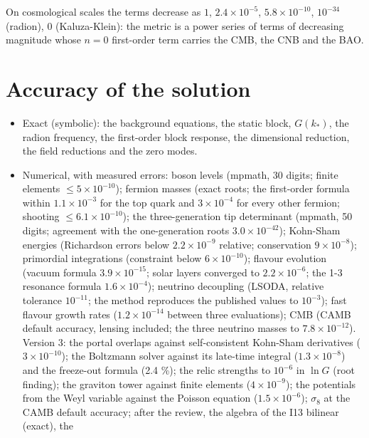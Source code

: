 \documentclass[
  10pt,
]{article}
\providecommand{\tightlist}{%
  \setlength{\itemsep}{0pt}\setlength{\parskip}{0pt}}
\begin{document}
On cosmological scales the terms decrease as \(1\),
\(2.4\times10^{-5}\), \(5.8\times10^{-10}\), \(10^{-34}\) (radion),
\(0\) (Kaluza-Klein): the metric is a power series of terms of
decreasing magnitude whose \(n = 0\) first-order term carries the CMB,
the CNB and the BAO.

\hypertarget{accuracy-of-the-solution}{%
\section{Accuracy of the solution}\label{accuracy-of-the-solution}}

\begin{itemize}
\tightlist
\item
  Exact (symbolic): the background equations, the static block,
  \(G(k_*)\), the radion frequency, the first-order block response, the
  dimensional reduction, the field reductions and the zero modes.
\item
  Numerical, with measured errors: boson levels (mpmath, 30 digits;
  finite elements \(\le 5\times10^{-10}\)); fermion masses (exact roots;
  the first-order formula within \(1.1\times10^{-3}\) for the top quark
  and \(3\times10^{-4}\) for every other fermion; shooting
  \(\le 6.1\times10^{-10}\)); the three-generation tip determinant
  (mpmath, 50 digits; agreement with the one-generation roots
  \(3.0\times10^{-42}\)); Kohn-Sham energies (Richardson errors below
  \(2.2\times10^{-9}\) relative; conservation \(9\times10^{-8}\));
  primordial integrations (constraint below \(6\times10^{-10}\));
  flavour evolution (vacuum formula \(3.9\times10^{-15}\); solar layers
  converged to \(2.2\times10^{-6}\); the 1-3 resonance formula
  \(1.6\times10^{-4}\)); neutrino decoupling (LSODA, relative tolerance
  \(10^{-11}\); the method reproduces the published values to
  \(10^{-3}\)); fast flavour growth rates (\(1.2\times10^{-14}\) between
  three evaluations); CMB (CAMB default accuracy, lensing included; the
  three neutrino masses to \(7.8\times10^{-12}\)). Version 3: the portal
  overlaps against self-consistent Kohn-Sham derivatives
  (\(3\times10^{-10}\)); the Boltzmann solver against its late-time
  integral (\(1.3\times10^{-8}\)) and the freeze-out formula (2.4 \%);
  the relic strengths to \(10^{-6}\) in \(\ln G\) (root finding); the
  graviton tower against finite elements (\(4\times10^{-9}\)); the
  potentials from the Weyl variable against the Poisson equation
  (\(1.5\times10^{-6}\)); \(\sigma_8\) at the CAMB default accuracy;
  after the review, the algebra of the I13 bilinear (exact), the

\end{itemize}
\end{document}
